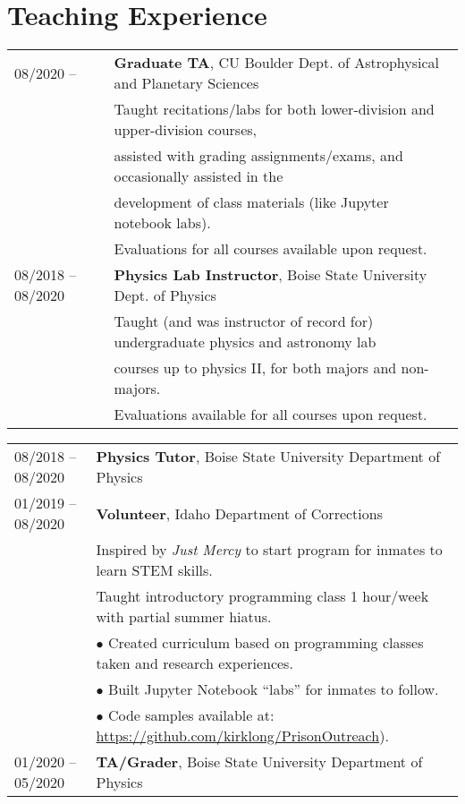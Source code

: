 \documentclass[11pt]{article}
\begin{document}
\section{Teaching Experience}
\begin{tabular}{ll}
08/2020 --	& 	\textbf{Graduate TA}, CU Boulder Dept. of Astrophysical and Planetary Sciences \vspace{1mm} \\
      & Taught recitations/labs for both lower-division and upper-division courses, \\
      & assisted with grading assignments/exams, and occasionally assisted in the \\
      & development of class materials (like Jupyter notebook labs).\\
      & Evaluations for all courses available upon request. \vspace{2mm} \\
08/2018 --	08/2020	& 	\textbf{Physics Lab Instructor}, Boise State University Dept. of Physics \vspace{1mm} \\
      & Taught (and was instructor of record for) undergraduate physics and astronomy lab \\
      & courses up to physics II, for both majors and non-majors.\\
      & Evaluations available for all courses upon request. \vspace{2mm} \\

\end{tabular}
\newpage
\begin{tabular}{ll}
08/2018 -- 08/2020   &   \textbf{Physics Tutor}, Boise State University Department of Physics \vspace{2mm} \\

01/2019 -- 08/2020   &   \textbf{Volunteer}, Idaho Department of Corrections \\
      & Inspired by \textit{Just Mercy} to start program for inmates to learn STEM skills.\vspace{2mm} \\
      & Taught introductory programming class 1 hour/week with partial summer hiatus.\\
      & $\bullet$ Created curriculum based on programming classes taken and research experiences.\\
      & $\bullet$ Built Jupyter Notebook ``labs'' for inmates to follow. \\
      & $\bullet$ Code samples available at: \url{https://github.com/kirklong/PrisonOutreach}). \vspace{2mm}\\
01/2020 -- 05/2020   &   \textbf{TA/Grader}, Boise State University Department of Physics

\end{tabular}
\end{document}
